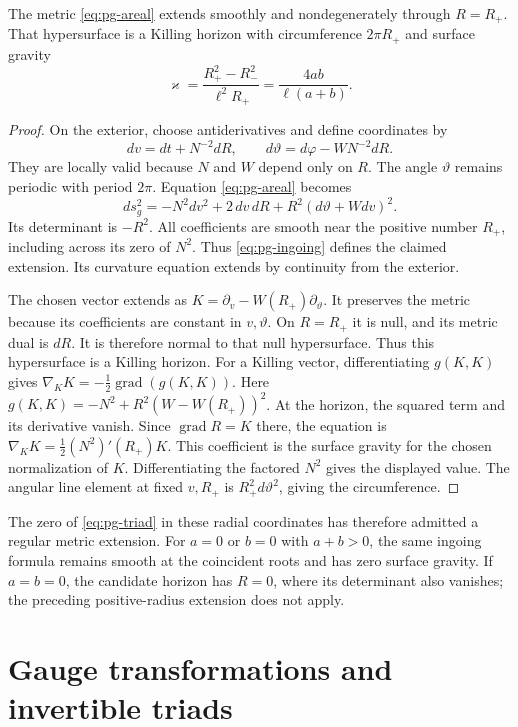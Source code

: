 \begin{proposition}\label{prop:pg-horizon}
The metric \eqref{eq:pg-areal} extends smoothly and nondegenerately through $R=R_+$.
That hypersurface is a Killing horizon with circumference $2\pi R_+$ and surface gravity
\[
 \varkappa=\frac{R_+^2-R_-^2}{\ell^2R_+}
          =\frac{4ab}{\ell(a+b)}.
\]
\end{proposition}
\begin{proof}
On the exterior, choose antiderivatives and define coordinates by
\[
 dv=dt+N^{-2}dR,\qquad d\vartheta=d\varphi-WN^{-2}dR.
\]
They are locally valid because $N$ and $W$ depend only on $R$.
The angle $\vartheta$ remains periodic with period $2\pi$.
Equation \eqref{eq:pg-areal} becomes
\begin{equation}\label{eq:pg-ingoing}
 ds_g^2=-N^2dv^2+2\,dv\,dR+R^2(d\vartheta+Wdv)^2.
\end{equation}
Its determinant is $-R^2$.
All coefficients are smooth near the positive number $R_+$, including across its zero of $N^2$.
Thus \eqref{eq:pg-ingoing} defines the claimed extension.
Its curvature equation extends by continuity from the exterior.

The chosen vector extends as $K=\partial_v-W(R_+)\partial_\vartheta$.
It preserves the metric because its coefficients are constant in $v,\vartheta$.
On $R=R_+$ it is null, and its metric dual is $dR$.
It is therefore normal to that null hypersurface.
Thus this hypersurface is a Killing horizon.
For a Killing vector, differentiating $g(K,K)$ gives
$\nabla_KK=-\tfrac12\operatorname{grad}(g(K,K))$.
Here $g(K,K)=-N^2+R^2(W-W(R_+))^2$.
At the horizon, the squared term and its derivative vanish.
Since $\operatorname{grad}R=K$ there, the equation is
$\nabla_KK=\tfrac12(N^2)'(R_+)K$.
This coefficient is the surface gravity for the chosen normalization of $K$.
Differentiating the factored $N^2$ gives the displayed value.
The angular line element at fixed $v,R_+$ is $R_+^2d\vartheta^2$, giving the circumference.
\end{proof}

The zero of \eqref{eq:pg-triad} in these radial coordinates has therefore admitted a regular metric extension.
For $a=0$ or $b=0$ with $a+b>0$, the same ingoing formula remains smooth at the coincident roots and has zero surface gravity.
If $a=b=0$, the candidate horizon has $R=0$, where its determinant also vanishes; the preceding positive-radius extension does not apply.

\section{Gauge transformations and invertible triads}

